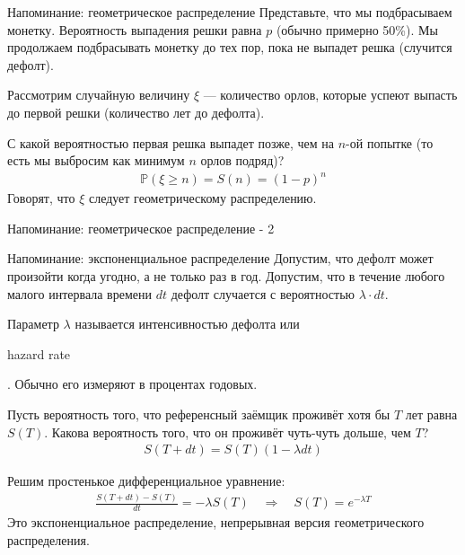 \documentclass{beamer}
\newcommand{\en}[1]{\begin{otherlanguage}{english}#1\end{otherlanguage}}
\begin{document}
\begin{frame}{Напоминание: геометрическое распределение}
\justify
Представьте, что мы подбрасываем монетку. Вероятность выпадения решки равна $p$ (обычно примерно 50\%). Мы продолжаем подбрасывать монетку до тех пор, пока не выпадет решка (случится дефолт). 

\justify
Рассмотрим случайную величину $\xi$ --- количество орлов, которые успеют выпасть до первой решки (количество лет до дефолта).

\justify
С какой вероятностью первая решка выпадет позже, чем на $n$-ой попытке (то есть мы выбросим как минимум $n$ орлов подряд)?
\begin{align*}
\mathbb{P}(\xi \ge n) = S(n) = (1 - p)^{n}
\end{align*}
\justify
Говорят, что $\xi$ следует \alert{геометрическому} распределению.
\end{frame}



\begin{frame}{Напоминание: геометрическое распределение - 2}
\centering
{}
\end{frame}



\begin{frame}{Напоминание: экспоненциальное распределение}
\justify
Допустим, что дефолт может произойти когда угодно, а не только раз в год. Допустим, что в течение любого малого интервала времени $dt$ дефолт случается с вероятностью $\lambda \cdot dt$.

\justify
Параметр $\lambda$ называется \alert{интенсивностью дефолта} или  \en{hazard rate}. Обычно его измеряют в процентах годовых.

\justify
Пусть вероятность того, что референсный заёмщик проживёт хотя бы $T$ лет равна $S(T)$. Какова вероятность того, что он проживёт чуть-чуть дольше, чем $T$?
\begin{align*}
S(T+dt) = S(T)(1 - \lambda dt)
\end{align*}

\justify
Решим простенькое дифференциальное уравнение:
\begin{align*}
\frac{S(T+dt) - S(T)}{dt} = -\lambda S(T) \quad
\Rightarrow
\quad
S(T) = e^{-\lambda T}
\end{align*}
\justify
Это \alert{экспоненциальное} распределение, непрерывная версия геометрического распределения.
\end{frame}
\end{document}
